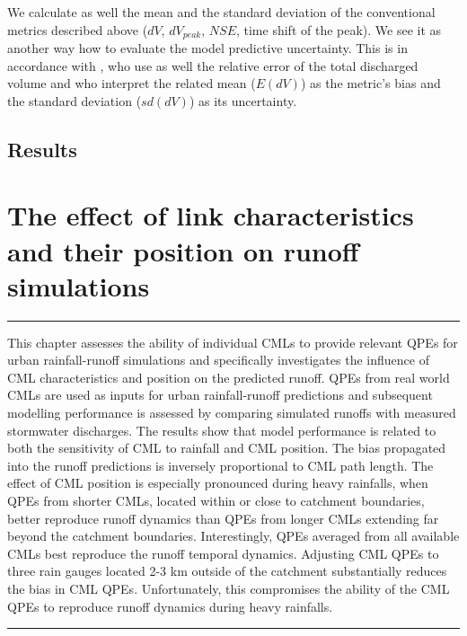 \documentclass{ctuthesis}\usepackage[]{graphicx}\usepackage[]{color}
\begin{document}
We calculate as well the mean and the standard deviation of the conventional metrics described above ($dV$, $dV_{peak}$, $N\!S\!E$, time shift of the peak). We see it as another way how to evaluate the model  predictive uncertainty. This is in accordance with \cite{fencl2013assessing}, who use as well the relative error of the total discharged volume and who interpret the related mean ($E(dV)$) as the metric's  bias and the standard deviation  ($sd(dV)$) as its uncertainty. 



\section{Results}


        
        


\chapter{The effect of link characteristics and their position on runoff simulations} \label{chap5}

\rule{\textwidth}{0.4pt}
This chapter assesses the ability of individual CMLs to provide relevant QPEs for urban rainfall-runoff simulations and specifically investigates the influence of CML characteristics and position on the predicted runoff. QPEs from real world CMLs are used as inputs for urban rainfall-runoff predictions and subsequent modelling performance is assessed by comparing simulated runoffs with measured stormwater discharges. The results show that model performance is related to both the sensitivity of CML to rainfall and CML position. The bias propagated into the runoff predictions is inversely proportional to CML path length. The effect of CML position is especially pronounced during heavy rainfalls, when QPEs from shorter CMLs, located within or close to catchment boundaries, better reproduce runoff dynamics than QPEs from longer CMLs extending far beyond the catchment boundaries. Interestingly, QPEs averaged from all available CMLs best reproduce the runoff temporal dynamics. Adjusting CML QPEs to three rain gauges located 2-3 km outside of the catchment substantially reduces the bias in CML QPEs. Unfortunately, this compromises the ability of the CML QPEs to reproduce runoff dynamics during heavy rainfalls.
\rule[0.2cm]{\textwidth}{0.4pt}
\end{document}
